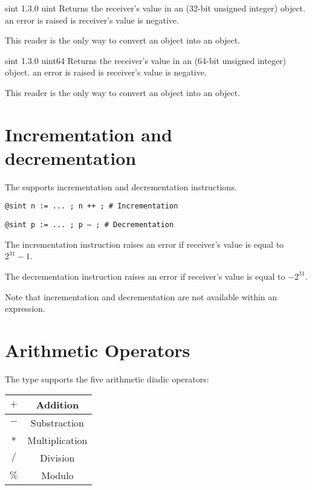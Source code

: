 {sint}
{1.3.0}
{uint}
{Returns the receiver's value in an  (32-bit unsigned integer) object.}
{an error is raised is receiver's value is negative.}

This reader is the only way to convert an  object into an  object.




{sint}
{1.3.0}
{uint64}
{Returns the receiver's value in an  (64-bit unsigned integer) object.}
{an error is raised is receiver's value is negative.}

This reader is the only way to convert an  object into an  object.





\section{Incrementation and decrementation}

The  supports incrementation and decrementation instructions.

\texttt{@sint n := ... ; n ++ ; \# Incrementation}

\texttt{@sint p := ... ; p -- ; \# Decrementation}\newline

The incrementation instruction raises an error if receiver's value is equal to $2^{31}-1$.\newline

The decrementation instruction raises an error if receiver's value is equal to $-2^{31}$.\newline

Note that incrementation and decrementation are not available within an expression.




\section{Arithmetic Operators}

The  type supports the five arithmetic diadic operators:\newline

\begin{tabular}{|c|c|}
\hline
$+$ & Addition \\
\hline
$-$ & Substraction \\
\hline
$*$ & Multiplication \\
\hline
$/$ & Division \\
\hline
$\%$ & Modulo \\
\hline
\end{tabular}

